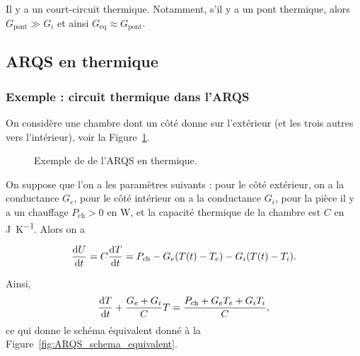         Il y a un \og court-circuit thermique\fg. Notamment, s'il y a un pont thermique, alors $G_{\text{pont}}\gg G_i$ et ainsi $G_{\text{eq}}\approx G_{\text{pont}}$.

    \subsection{ARQS en thermique}

        \subsubsection{Exemple : circuit thermique dans l'ARQS}

            On considère une chambre dont un côté donne sur l'extérieur (et les trois autres vers l'intérieur), voir la Figure~\ref{fig:ARSQ_thermique_exemple}.
            \begin{figure}
                \centering
                \caption{Exemple de de l'ARQS en thermique.}    
                \label{fig:ARSQ_thermique_exemple}
            \end{figure}

            On suppose que l'on a les paramètres suivants : pour le côté extérieur, on a la conductance $G_e$, pour le côté intérieur on a la conductance $G_i$, pour la pièce il y a un chauffage $P_{\text{ch}}>0$ en \si{\watt}, et la capacité thermique de la chambre est $C$ en \si{\joule\per\kelvin}. Alors on a

            \begin{equation*}
                \frac{\mathrm{d} U}{\mathrm{d} t}=C\frac{\mathrm{d} T}{\mathrm{d} t}=P_{\text{ch}}-G_e(T(t)-T_e)-G_i(T(t)-T_i).
            \end{equation*}

            Ainsi,
            \begin{equation*}
                \frac{\mathrm{d} T}{\mathrm{d} t}+\frac{G_e+G_i}{C}T=\frac{P_{\text{ch}}+G_e T_e+G_i T_i}{C},
            \end{equation*}
            ce qui donne le schéma équivalent donné à la Figure~\ref{fig:ARQS_schema_equivalent}.

